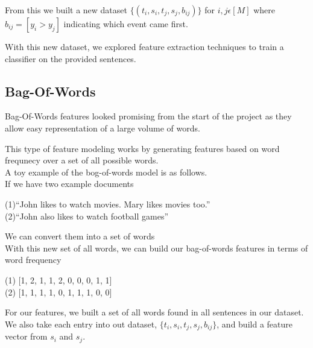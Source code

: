 \documentclass[12pt]{report}
\begin{document}
                From this we built a new dataset $\{(t_{i},s_{i},t_{j},s_{j},b_{ij})\}$ for $i,j \epsilon [M]$
                where $b_{ij} = [y_{i} > y_{j}]$ indicating which event came first.

                With this new dataset, we explored feature extraction techniques to train a classifier
                on the provided sentences.
                
                \subsection{Bag-Of-Words}
                Bag-Of-Words features looked promising from the start of the project
                as they allow easy representation of a large volume of words.

                This type of feature modeling works by generating features based on word
                frequnecy over a set of all possible words.\\

                

                \noindent A toy example of the bog-of-words model is as follows.\\
                If we have two example documents
                \begin{center}
                  (1)``John likes to watch movies. Mary likes movies too.''\\
                  (2)``John also likes to watch football games''
                \end{center}

                \noindent We can convert them into a set of words \\

                With this new set of all words, we can build our bag-of-words features
                in terms of word frequency
                \begin{center}
                (1) [1, 2, 1, 1, 2, 0, 0, 0, 1, 1]\\
                (2) [1, 1, 1, 1, 0, 1, 1, 1, 0, 0]
                \end{center}



                For our features, we built a set of all words found in all sentences in our
                dataset. We also take each entry into out dataset, $\{t_{i},s_{i},t_{j},s_{j},b_{ij}\}$,
                and build a feature vector from $s_{i}$ and $s_{j}$.
\end{document}

